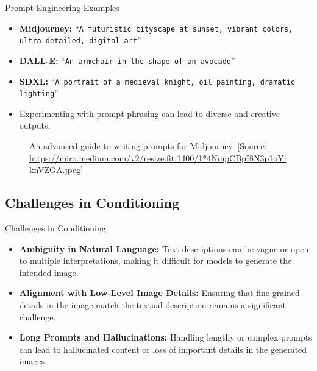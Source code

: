 \begin{frame}[allowframebreaks]{Prompt Engineering Examples}
    \begin{itemize}
        \item \textbf{Midjourney:} ``\texttt{A futuristic cityscape at sunset, vibrant colors, ultra-detailed, digital art}''
        \item \textbf{DALL-E:} ``\texttt{An armchair in the shape of an avocado}''
        \item \textbf{SDXL:} ``\texttt{A portrait of a medieval knight, oil painting, dramatic lighting}''
    \end{itemize}
    \vspace{1em}
    \begin{itemize}
        \item Experimenting with prompt phrasing can lead to diverse and creative outputs.
    \end{itemize}
\framebreak
    \begin{figure}
        \centering
        \caption*{An advanced guide to writing prompts for Midjourney. {\scriptsize [Source: \url{https://miro.medium.com/v2/resize:fit:1400/1*4NmpCBpI8N3p1oYiknVZGA.jpeg}]}}
    \end{figure}
\end{frame}

\subsection{Challenges in Conditioning}
\begin{frame}[allowframebreaks]{Challenges in Conditioning}
    \begin{itemize}
        \item \textbf{Ambiguity in Natural Language:} Text descriptions can be vague or open to multiple interpretations, making it difficult for models to generate the intended image.
        \item \textbf{Alignment with Low-Level Image Details:} Ensuring that fine-grained details in the image match the textual description remains a significant challenge.
        \item \textbf{Long Prompts and Hallucinations:} Handling lengthy or complex prompts can lead to hallucinated content or loss of important details in the generated images.
    \end{itemize}
\end{frame}